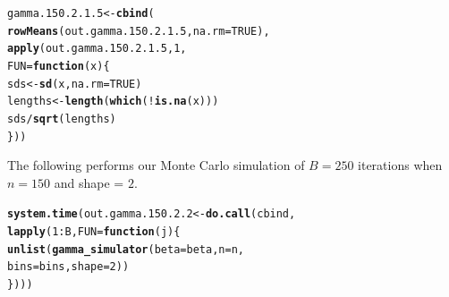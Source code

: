 \documentclass[11pt]{article}\usepackage[]{graphicx}\usepackage[]{color}
\makeatletter
\newcommand{\hlnum}[1]{\textcolor[rgb]{0.686,0.059,0.569}{#1}}%
\newcommand{\hlopt}[1]{\textcolor[rgb]{0,0,0}{#1}}%
\newcommand{\hlstd}[1]{\textcolor[rgb]{0.345,0.345,0.345}{#1}}%
\newcommand{\hlkwa}[1]{\textcolor[rgb]{0.161,0.373,0.58}{\textbf{#1}}}%
\newcommand{\hlkwb}[1]{\textcolor[rgb]{0.69,0.353,0.396}{#1}}%
\newcommand{\hlkwc}[1]{\textcolor[rgb]{0.333,0.667,0.333}{#1}}%
\newcommand{\hlkwd}[1]{\textcolor[rgb]{0.737,0.353,0.396}{\textbf{#1}}}%
\newenvironment{kframe}{%
 \def\at@end@of@kframe{}%
 \ifinner\ifhmode%
  \def\at@end@of@kframe{\end{minipage}}%
  \begin{minipage}{\columnwidth}%
 \fi\fi%
 \def\FrameCommand##1{\hskip\@totalleftmargin \hskip-\fboxsep
 \colorbox{shadecolor}{##1}\hskip-\fboxsep
     \hskip-\linewidth \hskip-\@totalleftmargin \hskip\columnwidth}%
 \MakeFramed {\advance\hsize-\width
   \@totalleftmargin\z@ \linewidth\hsize
   \@setminipage}}%
 {\par\unskip\endMakeFramed%
 \at@end@of@kframe}
\newenvironment{knitrout}{}{} %
\makeatother
\begin{document}
\begin{knitrout}
\color{fgcolor}\begin{kframe}
\begin{alltt}
\hlstd{gamma.150.2.1.5} \hlkwb{<-} \hlkwd{cbind}\hlstd{(}
  \hlkwd{rowMeans}\hlstd{(out.gamma.150.2.1.5,} \hlkwc{na.rm} \hlstd{=} \hlnum{TRUE}\hlstd{),}
  \hlkwd{apply}\hlstd{(out.gamma.150.2.1.5,} \hlnum{1}\hlstd{,}
  \hlkwc{FUN} \hlstd{=} \hlkwa{function}\hlstd{(}\hlkwc{x}\hlstd{)\{}
    \hlstd{sds} \hlkwb{<-} \hlkwd{sd}\hlstd{(x,} \hlkwc{na.rm} \hlstd{=} \hlnum{TRUE}\hlstd{)}
    \hlstd{lengths} \hlkwb{<-} \hlkwd{length}\hlstd{(}\hlkwd{which}\hlstd{(}\hlopt{!}\hlkwd{is.na}\hlstd{(x)))}
    \hlstd{sds} \hlopt{/} \hlkwd{sqrt}\hlstd{(lengths)}
  \hlstd{\}))}
\end{alltt}


{\ttfamily\noindent\bfseries\color{errorcolor}{\#\# Error in is.data.frame(x): object 'out.gamma.150.2.1.5' not found}}\end{kframe}
\end{knitrout}

The following performs our Monte Carlo simulation of $B = 250$ iterations 
when $n = 150$ and shape = $2$.

\begin{knitrout}
\color{fgcolor}\begin{kframe}
\begin{alltt}
\hlkwd{system.time}\hlstd{(out.gamma.150.2.2} \hlkwb{<-} \hlkwd{do.call}\hlstd{(cbind,}
  \hlkwd{lapply}\hlstd{(}\hlnum{1}\hlopt{:}\hlstd{B,} \hlkwc{FUN} \hlstd{=} \hlkwa{function}\hlstd{(}\hlkwc{j}\hlstd{)\{}
    \hlkwd{unlist}\hlstd{(}\hlkwd{gamma_simulator}\hlstd{(}\hlkwc{beta} \hlstd{= beta,} \hlkwc{n} \hlstd{= n,}
      \hlkwc{bins} \hlstd{= bins,} \hlkwc{shape} \hlstd{=} \hlnum{2}\hlstd{))}
\hlstd{\})))}
\end{alltt}


{\ttfamily\noindent\bfseries\color{errorcolor}{\#\# Error in eval(predvars, data, env): object 'x1' not found}}

{\ttfamily\noindent\itshape\color{messagecolor}{\#\# Timing stopped at: 0.002 0 0.002}}\end{kframe}
\end{knitrout}
\end{document}
